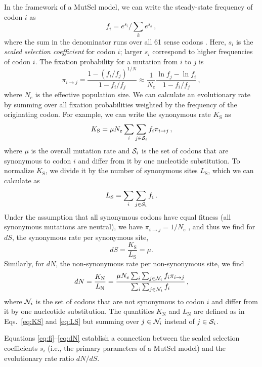 \documentclass[11pt]{article}
\begin{document}
In the framework of a MutSel model, we can write the steady-state frequency of codon $i$ as
\begin{equation}\label{eq:fi}
 f_i=e^{s_i}\Big/\sum_k e^{s_k}\,,
\end{equation}
where the sum in the denominator runs over all 61 sense codons \cite{SellaHirsh2005}. Here, $s_i$ is the \emph{scaled selection coefficient} for codon $i$; larger $s_i$ correspond to higher frequencies of codon $i$. The fixation probability for a mutation from $i$ to $j$ is \cite{HalpernBruno1998,SellaHirsh2005}
\begin{equation}
  \pi_{i\rightarrow j} = \frac{1-(f_i/f_j)^{1/N}}{1-f_i/f_j}
  \approx \frac{1}{N_e} \frac{\ln f_j - \ln f_i}{1-f_i/f_j}\,,
\end{equation}
where $N_e$ is the effective population size. We can calculate an evolutionary rate by summing over all fixation probabilities weighted by the frequency of the originating codon. For example, we can write the synonymous rate $K_\text{S}$ as
\begin{equation}\label{eq:KS}
  K_\text{S} = \mu N_e \sum_i \sum_{j \in {\cal S}_i} f_i  \pi_{i\rightarrow j}\,,
\end{equation}
where $\mu$ is the overall mutation rate and ${\cal S}_i$ is the set of codons that are synonymous to codon $i$ and differ from it by one nucleotide substitution. To normalize $K_\text{S}$, we divide it by the number of synonymous sites $L_\text{S}$, which we can calculate as 
\begin{equation}\label{eq:LS}
  L_\text{S} = \sum_i \sum_{j \in {\cal S}_i} f_i \,.
\end{equation}
Under the assumption that all synonymous codons have equal fitness (all synonymous mutations are neutral), we have $\pi_{i\rightarrow j}=1/N_e$ \cite{CrowKimura1970}, and thus we find for $dS$, the synonymous rate per synonymous site,
\begin{equation}\label{eq:dS}
  dS = \frac{K_\text{S}}{L_\text{S}}=\mu.
\end{equation}
Similarly, for $dN$, the non-synonymous rate per non-synonymous site, we find
\begin{equation}\label{eq:dN}
  dN = \frac{K_\text{N}}{L_\text{N}}=\frac{\mu N_e \sum_i \sum_{j \in {\cal N}_i} f_i  \pi_{i\rightarrow j}}{\sum_i \sum_{j \in {\cal N}_i} f_i}\,,
\end{equation}
where ${\cal N}_i$ is the set of codons that are not synonymous to codon $i$ and differ from it by one nucleotide substitution. The quantities $K_\text{N}$ and $L_\text{N}$ are defined as in Eqs.~\eqref{eq:KS} and \eqref{eq:LS} but summing over $j\in {\cal N}_i$ instead of $j\in {\cal S}_i$.

Equations \eqref{eq:fi}--\eqref{eq:dN} establish a connection between the scaled selection coefficients $s_i$ (i.e., the primary parameters of a MutSel model) and the evolutionary rate ratio $dN/dS$.

	
	
	
	
	
	
	
	
	
\newpage

	
	
\end{document}
